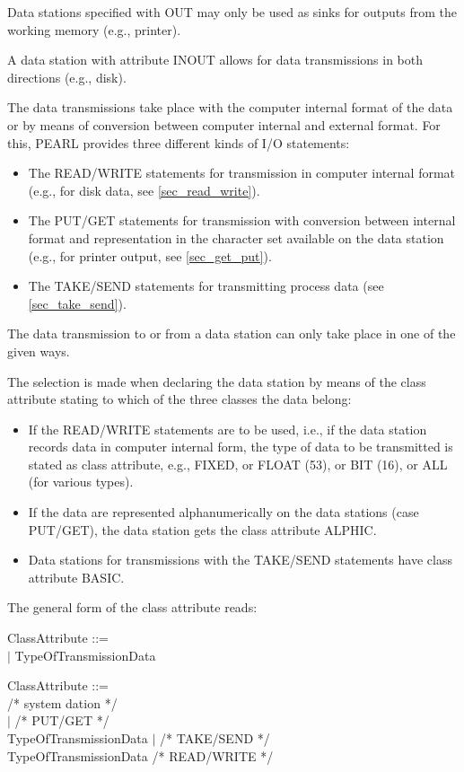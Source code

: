 Data stations specified with OUT may only be used as sinks for outputs
from the working memory (e.g., printer).

A data station with attribute INOUT allows for data transmissions in
both directions (e.g., disk).

The data transmissions take place with the computer internal format of
the data or by means of conversion between computer internal and
external format. For this, PEARL provides three different kinds of I/O
statements:
\begin{itemize}
\item The READ/WRITE statements for transmission in computer internal
format (e.g., for disk data, see \ref{sec_read_write}).
\item The PUT/GET statements for transmission with conversion between
internal format and representation in the character set available on the
data station (e.g., for printer output, see \ref{sec_get_put}).
\item The TAKE/SEND statements for transmitting process data (see
\ref{sec_take_send}).
\end{itemize}

The data transmission to or from a data station can only take place in
one of the given ways.

The selection is made when declaring the data station by means of the
class attribute stating to which of the three classes the data belong:
\begin{itemize}
\item If the READ/WRITE statements are to be used, i.e., if the data
station records data in computer internal form, the type of data to be
transmitted is stated as class attribute, e.g., FIXED, or FLOAT (53),
or BIT (16), or ALL (for various types).
\item If the data are represented alphanumerically on the data stations
(case PUT/GET), the data station gets the class attribute ALPHIC.
\item Data stations for transmissions with the TAKE/SEND statements
have class attribute BASIC.
\end{itemize}

The general form of the class attribute reads:

\begin{removed}
ClassAttribute ::= \\
 $\mid$ TypeOfTransmissionData
\end{removed}
\begin{added}
ClassAttribute ::= \\
\x [ {\bf SYSTEM} ]  /* system dation */\\
\x {} $\mid$                  /* PUT/GET */ \\
\x {}  TypeOfTransmissionData $\mid$  /* TAKE/SEND */\\
\x \x  TypeOfTransmissionData               /* READ/WRITE */ \\
\end{added}


